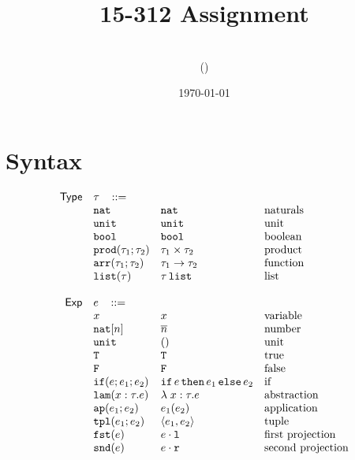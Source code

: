 \documentclass[11pt]{article}
\title{15-312 Assignment \hwnumber}
\author{\myname\\(\myandrewid)}
\date{\today}
\newcommand{\ms}[1]{\ensuremath{\mathsf{#1}}}
\newcommand{\irl}[1]{\mathtt{#1}}
\begin{document}
\maketitle

\section{Syntax}

\[
\begin{array}{r l l l l}
\ms{Type} & \tau \,\,\,\,\, ::= \\
	& \irl{nat}                	 			& \irl{nat}											& \text{naturals}\\
	& \unittyabt                	 			& \unittycst										& \text{unit}\\
  & \booltyabt                       & \booltycst                    & \text{boolean}\\
  & \prodtyabt{\tau_1}{\tau_2}       & \prodtycst{\tau_1}{\tau_2}    & \text{product}\\
	&\irl{arr}(\tau_1;\tau_2) 				& \arrtycst{\tau_1}{\tau_2} 									& \text{function}\\
  &\listtyabt{\tau}		& \listtycst{\tau}											& \text{list}\\
	 \\
\ms{Exp}
        & e   \,\,\,\,\, ::= \\
 	& x                                			& x 												& \text{variable}\\
  & \irl{nat}[n]							& \numeral{n}												& \text{number}\\
  & \irl{unit}							& ()												& \text{unit}\\
  & \irl{T}							& \irl{T}												& \text{true}\\
  & \irl{F}	   					& \irl{F}												& \text{false}\\
  & \ifexabt{e}{e_1}{e_2} & \ifexcst{e}{e_1}{e_2}  & \text{if}\\
  & \irl{lam}(x:\tau.e) 						&\lambda \; x : \tau. e 		& \text{abstraction}\\
  & \irl{ap}(e_1;e_2) 					& \appcst{e_1}{e_2} 										& \text{application}\\
  & \irl{tpl}(e_1;e_2)     	& \pairexcst{e_1}{e_2}                									& \text{tuple}\\
 	& \irl{fst}(e)					& \fstexcst{e}   										& \text{first projection}\\
 	& \irl{snd}(e)					& \sndexcst{e}   										& \text{second projection}\\

\end{array}\]
\end{document}
